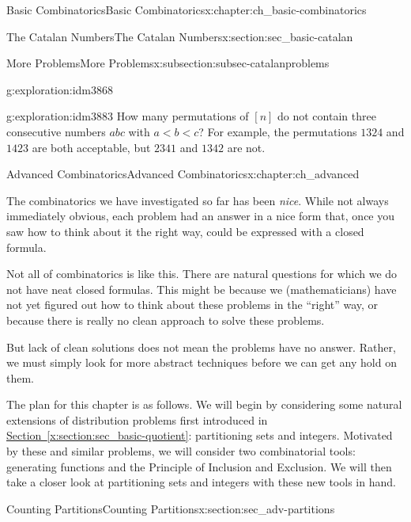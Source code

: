 \documentclass[oneside,10pt,]{book}
\numberwithin{equation}{chapter}
\newcommand{\lt}{<}
\begin{document}
\begin{chapterptx}{Basic Combinatorics}{}{Basic Combinatorics}{}{}{x:chapter:ch_basic-combinatorics}
\begin{sectionptx}{The Catalan Numbers}{}{The Catalan Numbers}{}{}{x:section:sec_basic-catalan}
\begin{subsectionptx}{More Problems}{}{More Problems}{}{}{x:subsection:subsec-catalanproblems}
\begin{exploration}{}{g:exploration:idm3868}
\end{exploration}
\begin{exploration}{}{g:exploration:idm3883}%
How many permutations of \([n]\) do not contain three consecutive numbers \(abc\) with \(a \lt b \lt c\)?  For example, the permutations \(1324\) and \(1423\) are both acceptable, but \(2341\) and \(1342\) are not.%
\end{exploration}
\end{subsectionptx}
\end{sectionptx}
\end{chapterptx}
%
%
\typeout{************************************************}
\typeout{************************************************}
%
\begin{chapterptx}{Advanced Combinatorics}{}{Advanced Combinatorics}{}{}{x:chapter:ch_advanced}
\begin{introduction}{}%
The combinatorics we have investigated so far has been \emph{nice}.  While not always immediately obvious, each problem had an answer in a nice form that, once you saw how to think about it the right way, could be expressed with a closed formula.%
\par
Not all of combinatorics is like this.  There are natural questions for which we do not have neat closed formulas.  This might be because we (mathematicians) have not yet figured out how to think about these problems in the ``right'' way, or because there is really no clean approach to solve these problems.%
\par
But lack of clean solutions does not mean the problems have no answer.  Rather, we must simply look for more abstract techniques before we can get any hold on them.%
\par
The plan for this chapter is as follows.  We will begin by considering some natural extensions of distribution problems first introduced in \hyperref[x:section:sec_basic-quotient]{Section~\ref{x:section:sec_basic-quotient}}: partitioning sets and integers.  Motivated by these and similar problems, we will consider two combinatorial tools: generating functions and the Principle of Inclusion and Exclusion.  We will then take a closer look at partitioning sets and integers with these new tools in hand.%
\end{introduction}%
%
%
\typeout{************************************************}
\typeout{************************************************}
%
\begin{sectionptx}{Counting Partitions}{}{Counting Partitions}{}{}{x:section:sec_adv-partitions}

\end{sectionptx}
\end{chapterptx}
\end{document}
